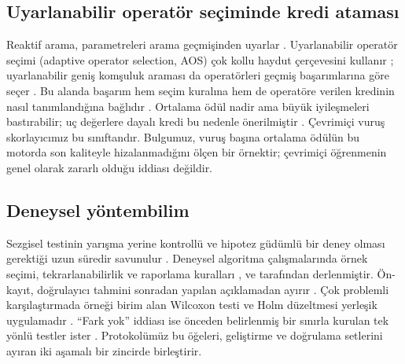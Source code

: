 \subsection{Uyarlanabilir operatör seçiminde kredi ataması}
Reaktif arama, parametreleri arama geçmişinden uyarlar \citep{battiti_2009_reactive}. Uyarlanabilir
operatör seçimi (adaptive operator selection, AOS) çok kollu haydut çerçevesini kullanır
\citep{auer_2002_ucb, dacosta_2008_aos}; uyarlanabilir geniş komşuluk araması da operatörleri geçmiş
başarımlarına göre seçer \citep{ropke_2006_alns}. Bu alanda başarım hem seçim kuralına \citep{thierens_2005_pursuit} hem de operatöre verilen kredinin nasıl tanımlandığına bağlıdır \citep{fialho_2010_aos}. Ortalama ödül nadir ama büyük
iyileşmeleri bastırabilir; uç değerlere dayalı kredi bu nedenle önerilmiştir \citep{fialho_2008_extreme}.
Çevrimiçi vuruş skorlayıcımız bu sınıftandır. Bulgumuz, vuruş başına ortalama ödülün bu motorda
son kaliteyle hizalanmadığını ölçen bir örnektir; çevrimiçi öğrenmenin genel olarak zararlı olduğu
iddiası değildir.

\subsection{Deneysel yöntembilim}
Sezgisel testinin yarışma yerine kontrollü ve hipotez güdümlü bir deney olması gerektiği uzun
süredir savunulur \citep{hooker_1995_testing}. Deneysel algoritma çalışmalarında örnek seçimi,
tekrarlanabilirlik ve raporlama kuralları \citet{johnson_2002_guide}, \citet{mcgeoch_2012_guide} ve
\citet{bartzbeielstein_2020_benchmarking} tarafından derlenmiştir. Ön-kayıt, doğrulayıcı tahmini
sonradan yapılan açıklamadan ayırır \citep{nosek_2018_prereg}. Çok problemli karşılaştırmada örneği
birim alan Wilcoxon testi ve Holm düzeltmesi yerleşik uygulamadır
\citep{demsar_2006_comparisons, wilcoxon_1945, holm_1979}. ``Fark yok'' iddiası ise önceden belirlenmiş
bir sınırla kurulan tek yönlü testler ister \citep{schuirmann_1987_tost, lakens_2017_equivalence}.
Protokolümüz bu öğeleri, geliştirme ve doğrulama setlerini ayıran iki aşamalı bir zincirde birleştirir.
